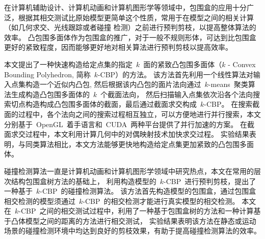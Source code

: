 \begin{cabstract}
  
在计算机辅助设计、计算机动画和计算机图形学等领域中，包围盒的应用十分广泛，根据其相交测试比原始模型更简单这个性质，常用于在模型之间的相关计算（如几何求交、光线跟踪或者碰撞
检测）之前进行预判剪枝，以提高整体算法的效率。
凸包围多面体作为包围盒的推广，对于一般不规则形体，可达到比包围盒更好的紧致程度，因而能够更好地对相关算法进行预判剪枝以提高效率。

本文提出了一种快速构造给定点集的指定~$k$~面的紧致凸包围多面体（$k$ - Convex Bounding Polyhedron, 简称~$k$-CBP）的方法。
该方法首先利用一个线性算法对输入点集构造一个近似内凸包, 然后根据该内凸包的面片法向通过~$k$-means~聚类算法生成构造凸包围多面体的~$k$~个截面法向，
然后扫描输入点集依次沿各个法向搜索切点构造构成凸包围多面体的截面，最后通过截面求交构成~$k$-CBP。 
在搜索截面的过程中，各个法向之间的搜索过程相互独立，可以方便地进行并行搜索，本文分别基于~OpenGL~着手语言和~CUDA~两种平台提供了并行加速的方案。
在截面求交过程中，本文利用计算几何中的对偶映射技术加快求交过程。
实验结果表明，与同类算法相比，本文方法能够更快地构造给定点集更加紧致的凸包围多面体。

碰撞检测算法一直是计算机动画和计算机图形学领域中研究热点，本文在常用的层次结构包围盒树方法的基础上，
利用构造模型的~$k$-CBP~进行预判剪枝，提出了一种基于~$k$-CBP~的碰撞检测算法。
该方法首先构造模型的包围盒，通过包围盒相交检测的模型须通过~$k$-CBP~的相交检测才能进行真实模型的相交检测。
本文在~$k$-CBP~之间的相交测试过程中，利用了一种基于包围盒树的方法和一种计算基于凸体模型之间的距离的方法进行相交测试，
实验结果表明该方法在静态或运动场景的碰撞检测环境中均达到良好的剪枝效果，有助于提高碰撞检测算法的效率。



\end{cabstract}


